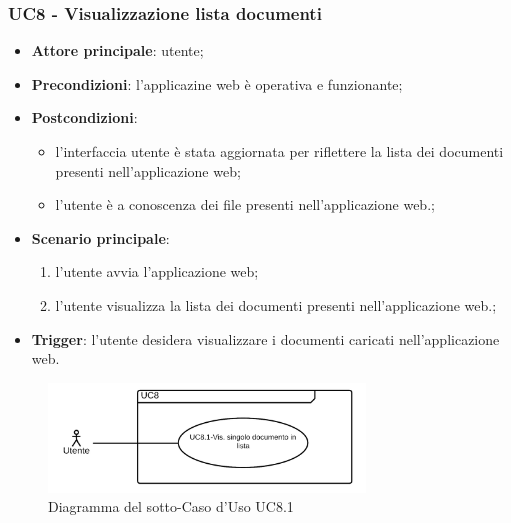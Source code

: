 \documentclass[10pt, a4paper]{article}
\begin{document}
    \subsubsection{UC8 - Visualizzazione lista documenti}
    \begin{itemize}
        \item \textbf{Attore principale}: utente;
        \item \textbf{Precondizioni}: l'applicazine web è operativa e funzionante;
        \item \textbf{Postcondizioni}:
        \begin{itemize}
            \item l'interfaccia utente è stata aggiornata per riflettere la lista dei documenti presenti nell'applicazione web;
            \item l'utente è a conoscenza dei file presenti nell'applicazione web.;
        \end{itemize} 
        \item \textbf{Scenario principale}:
        \begin{enumerate}
            \item l'utente avvia l'applicazione web;
            \item l'utente visualizza la lista dei documenti presenti nell'applicazione web.;
        \end{enumerate}
        \item \textbf{Trigger}: l'utente desidera visualizzare i documenti caricati nell'applicazione web.
    \end{itemize}

    \begin{figure}[h]
        \centering
        \includegraphics[width=0.75\textwidth, height=0.75\textheight, keepaspectratio]{UC-images/UC8.1.png}
        \caption{Diagramma del sotto-Caso d'Uso UC8.1}
    \end{figure}
    
\end{document}
